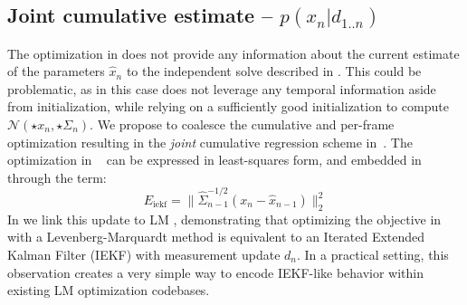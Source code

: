 \subsection{Joint cumulative estimate -- $p(x_n|d_{1..n})$}
\label{sec:joint}
The optimization in  does not provide any information about the current estimate of the parameters $\hat{x}_n$ to the independent solve described in . This could be problematic, as in this case  does not leverage any temporal information aside from initialization, while relying on a sufficiently good initialization to compute $\mathcal{N}(\star{x}_n, \star{\Sigma}_n)$. 
%
% 
% 
%
We propose to coalesce the cumulative and per-frame optimization resulting in the \emph{joint} cumulative regression scheme in~. 
The optimization in ~ can be expressed in least-squares form, and embedded in  through the term:
% 
\begin{equation}
E_\text{iekf} = \| \hat{\Sigma}^{-1/2}_{n - 1}(x_n - \hat{x}_{n - 1})\|_2^2 
\label{eq:iekflm}   
\end{equation}
%
In  we link this update to LM \cite{Skoglund15}, demonstrating that optimizing the objective in~ with a Levenberg-Marquardt method is equivalent to an Iterated Extended Kalman Filter (IEKF) with measurement update $d_n$.   In a practical setting, this observation creates a very simple way to encode IEKF-like behavior within existing LM optimization codebases.  



